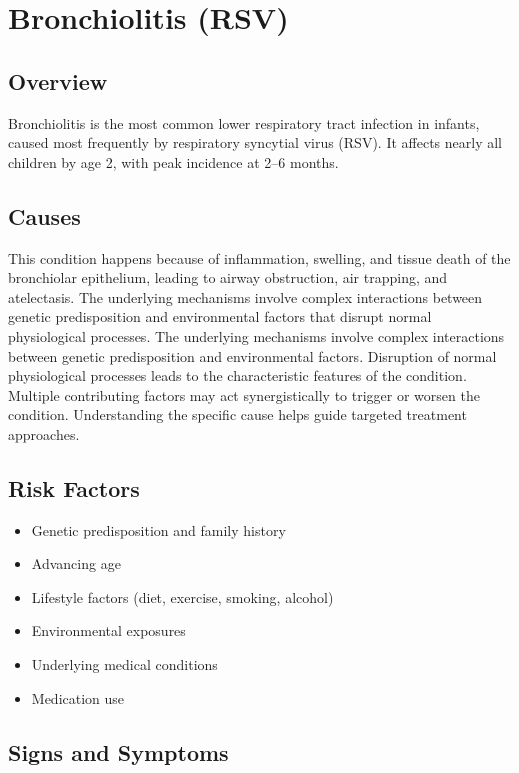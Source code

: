 \chapter{Bronchiolitis (RSV)}
\label{sec:Bronchiolitis}

\section{Overview}
Bronchiolitis is the most common lower respiratory tract infection in infants, caused most frequently by respiratory syncytial virus (RSV). It affects nearly all children by age 2, with peak incidence at 2--6 months.
\section{Causes}
This condition happens because of inflammation, swelling, and tissue death of the bronchiolar epithelium, leading to airway obstruction, air trapping, and atelectasis. The underlying mechanisms involve complex interactions between genetic predisposition and environmental factors that disrupt normal physiological processes. The underlying mechanisms involve complex interactions between genetic predisposition and environmental factors. Disruption of normal physiological processes leads to the characteristic features of the condition. Multiple contributing factors may act synergistically to trigger or worsen the condition. Understanding the specific cause helps guide targeted treatment approaches.
\section{Risk Factors}


\begin{itemize}[noitemsep]
  \item Genetic predisposition and family history
  \item Advancing age
  \item Lifestyle factors (diet, exercise, smoking, alcohol)
  \item Environmental exposures
  \item Underlying medical conditions
  \item Medication use
\end{itemize}
\section{Signs and Symptoms}

